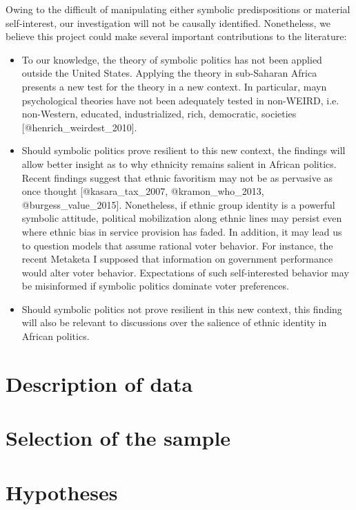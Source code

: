 \documentclass[]{article}
\begin{document}
Owing to the difficult of manipulating either symbolic predispositions
or material self-interest, our investigation will not be causally
identified. Nonetheless, we believe this project could make several
important contributions to the literature:

\begin{itemize}
  \item To our knowledge, the theory of symbolic politics has not been applied outside the United States. Applying the theory in sub-Saharan Africa presents a new test for the theory in a new context. In particular, mayn psychological theories have not been adequately tested in non-WEIRD, i.e. non-Western, educated, industrialized, rich, democratic, societies [@henrich_weirdest_2010].
  \item Should symbolic politics prove resilient to this new context, the findings will allow better insight as to why ethnicity remains salient in African politics. Recent findings suggest that ethnic favoritism may not be as pervasive as once thought [@kasara_tax_2007, @kramon_who_2013, @burgess_value_2015]. Nonetheless, if ethnic group identity is a powerful symbolic attitude, political mobilization along ethnic lines may persist even where ethnic bias in service provision has faded. In addition, it may lead us to question models that assume rational voter behavior. For instance, the recent Metaketa I supposed that information on government performance would alter voter behavior. Expectations of such self-interested behavior may be misinformed if symbolic politics dominate voter preferences.
  \item Should symbolic politics not prove resilient in this new context, this finding will also be relevant to discussions over the salience of ethnic identity in African politics.
\end{itemize}

\section{Description of data}\label{description-of-data}

\section{Selection of the sample}\label{selection-of-the-sample}

\section{Hypotheses}\label{hypotheses}
\end{document}
